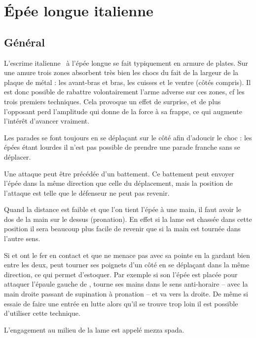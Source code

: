 \chapter{Épée longue italienne}


\section{Général}



L'escrime italienne~\footnotemark{} à l'épée longue se fait typiquement en armure de plates.
Sur une amure trois zones absorbent très bien les chocs du fait de la largeur de la plaque de métal : les avant-bras et bras, les cuisses et le ventre (côtés compris).
Il est donc possible de rabattre volontairement l'arme adverse sur ces zones, cf les trois premiers techniques.
Cela provoque un effet de surprise, et de plus l'opposant perd l'amplitude qui donne de la force à sa frappe, ce qui augmente l'intérêt d'avancer vraiment.

Les parades se font toujours en se déplaçant sur le côté afin d'adoucir le choc : les épées étant lourdes il n'est pas possible de prendre une parade franche sans se déplacer.

Une attaque peut être précédée d'un battement.
Ce battement peut envoyer l'épée dans la même direction que celle du déplacement, mais la position de l'attaque est telle que le défenseur ne peut pas revenir.

Quand la distance est faible et que l'on tient l'épée à une main, il faut avoir le dos de la main sur le dessus (pronation).
En effet si la lame est chassée dans cette position il sera beaucoup plus facile de revenir que si la main est tournée dans l'autre sens.

Si \A et \D ont le fer en contact et que \A ne menace pas \D avec sa pointe en la gardant bien entre les deux, \D peut tourner ses poignets d'un côté en se déplaçant dans la même direction, ce qui permet d'estoquer.
Par exemple si son l'épée est placée pour attaquer l'épaule gauche de \A, \D tourne ses mains dans le sens anti-horaire – avec la main droite passant de supination à pronation – et va vers la droite.
De même si \A essaie de faire une entrée en lutte alors qu'il se trouve trop loin il est possible d'utiliser cette technique.


\begin{definition}

L'engagement au milieu de la lame est appelé mezza spada.
\end{definition}


